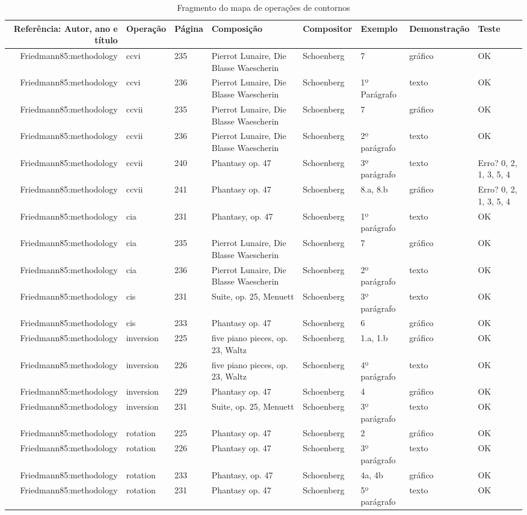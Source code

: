 \documentclass[11pt]{article}
\begin{document}
\begin{table}
  \centering
  \begin{tabular}{r|lllllll}
    Referência: Autor, ano e título&Operação&Página&Composição&Compositor&Exemplo&Demonstração&Teste\\
    \hline
    Friedmann85:methodology&ccvi&235&Pierrot Lunaire, Die Blasse Waescherin&Schoenberg&7&gráfico&OK\\
    Friedmann85:methodology&ccvi&236&Pierrot Lunaire, Die Blasse Waescherin&Schoenberg&1º Parágrafo&texto&OK\\
    Friedmann85:methodology&ccvii&235&Pierrot Lunaire, Die Blasse Waescherin&Schoenberg&7&gráfico&OK\\
    Friedmann85:methodology&ccvii&236&Pierrot Lunaire, Die Blasse Waescherin&Schoenberg&2º parágrafo&texto&OK\\
    Friedmann85:methodology&ccvii&240&Phantasy op. 47&Schoenberg&3º parágrafo&texto&Erro? 0, 2, 1, 3, 5, 4\\
    Friedmann85:methodology&ccvii&241&Phantasy op. 47&Schoenberg&8.a, 8.b&gráfico&Erro? 0, 2, 1, 3, 5, 4\\
    Friedmann85:methodology&cia&231&Phantasy, op. 47&Schoenberg&1º parágrafo&texto&OK\\
    Friedmann85:methodology&cia&235&Pierrot Lunaire, Die Blasse Waescherin&Schoenberg&7&gráfico&OK\\
    Friedmann85:methodology&cia&236&Pierrot Lunaire, Die Blasse Waescherin&Schoenberg&2º parágrafo&texto&OK\\
    Friedmann85:methodology&cis&231&Suite, op. 25, Menuett&Schoenberg&3º parágrafo&texto&OK\\
    Friedmann85:methodology&cis&233&Phantasy op. 47&Schoenberg&6&gráfico&OK\\
    Friedmann85:methodology&inversion&225&five piano pieces, op. 23, Waltz&Schoenberg&1.a, 1.b&gráfico&OK\\
    Friedmann85:methodology&inversion&226&five piano pieces, op. 23, Waltz&Schoenberg&4º parágrafo&texto&OK\\
    Friedmann85:methodology&inversion&229&Phantasy op. 47&Schoenberg&4&gráfico&OK\\
    Friedmann85:methodology&inversion&231&Suite, op. 25, Menuett&Schoenberg&3º parágrafo&texto&OK\\
    Friedmann85:methodology&rotation&225&Phantasy op. 47&Schoenberg&2&gráfico&OK\\
    Friedmann85:methodology&rotation&226&Phantasy op. 47&Schoenberg&3º parágrafo&texto&OK\\
    Friedmann85:methodology&rotation&233&Phantasy, op. 47&Schoenberg&4a, 4b&gráfico&OK\\
    Friedmann85:methodology&rotation&231&Phantasy op. 47&Schoenberg&5º parágrafo&texto&OK\\
  \end{tabular}
  \caption{Fragmento do mapa de operações de contornos}
  \label{tab:mapa-operacoes}
\end{table}
\end{document}
